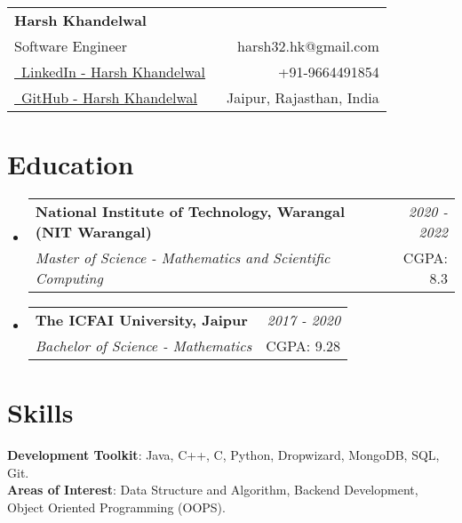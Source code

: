 \documentclass[a4paper,12pt]{article}
\makeatletter
\newcommand{\resumeSubheading}[4]{
\vspace{0.5mm}\item[]
    \begin{tabular*}{0.98\textwidth}[t]{l@{\extracolsep{\fill}}r}
        \textbf{#1} & \textit{\footnotesize{#4}} \\
        \textit{\footnotesize{#3}} &  \footnotesize{#2}\\
    \end{tabular*}
    \vspace{-1.0mm}
}
\newcommand{\resumeSubHeadingListStart}{\begin{itemize}[leftmargin=*,labelsep=0mm]}
\newcommand{\resumeSubHeadingListEnd}{\end{itemize}\vspace{2mm}}
\newcommand{\name}{Harsh Khandelwal} %
\newcommand{\phone}{9664491854} %
\newcommand{\emaila}{harsh32.hk@gmail.com} %
\makeatother
\begin{document}


\parbox{\dimexpr\linewidth-0.5cm\relax}{
\begin{tabularx}{\linewidth}{L r} \\
  \textbf{\Large \name}\\
  {Software Engineer} & \raisebox{0.0\height}{\footnotesize \faEnvelope}\ {\emaila} \\
  \href{https://www.linkedin.com/in/harsh-khandelwal-094866201/}{\raisebox{0.0\height}{\footnotesize \faLinkedin}\ LinkedIn - Harsh Khandelwal} &  {\raisebox{0.0\height}{\footnotesize \faPhone}\ +91-\phone} \\
  \href{https://github.com/redhlk}{\raisebox{0.0\height}{\footnotesize \faGithub}\ {GitHub - \name}}
  & {\raisebox{0.0\height}{\footnotesize}\ Jaipur, Rajasthan, India}\\
\end{tabularx}
}

\section{\textbf{Education}}
  \resumeSubHeadingListStart
    \resumeSubheading
      {National Institute of Technology, Warangal (NIT Warangal)}{CGPA: 8.3}
      {Master of Science - Mathematics and Scientific Computing }{2020 - 2022}
    \resumeSubheading
      {The ICFAI University, Jaipur}{CGPA: 9.28}
      {Bachelor of Science - Mathematics}{2017 - 2020}
  \resumeSubHeadingListEnd
\vspace{-5.5mm}
%


\section{\textbf{Skills}}
 \begin{itemize}[leftmargin=0.05in, label={}]
    \small{\item{
     \textbf{Development Toolkit}{: Java, C++, C, Python, Dropwizard, MongoDB, SQL, Git.} \\
         \vspace{2pt}
     \textbf{Areas of Interest}{: Data Structure and Algorithm, Backend Development, Object Oriented Programming (OOPS).}
    }}
 \end{itemize}
 \vspace{-12pt}
\end{document}
